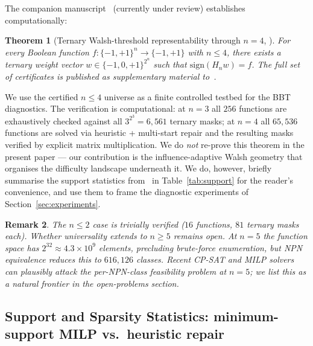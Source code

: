 \documentclass[11pt]{article}
\newtheorem{theorem}{Theorem}[section]
\newtheorem{remark}[theorem]{Remark}
\newcommand{\sign}{\mathrm{sign}}
\begin{document}
The companion manuscript~\cite{spectralSynthesisCompanion} (currently under review) establishes computationally:

\begin{theorem}[Ternary Walsh-threshold representability through $n=4$, \cite{spectralSynthesisCompanion}]
\label{thm:universality}
For every Boolean function $f:\{-1,+1\}^n \to \{-1,+1\}$ with $n \le 4$, there exists a ternary weight vector $w \in \{-1,0,+1\}^{2^n}$ such that $\sign(H_n w) = f$. The full set of certificates is published as supplementary material to~\cite{spectralSynthesisCompanion}.
\end{theorem}

We use the certified $n \le 4$ universe as a finite controlled testbed for the BBT diagnostics. The verification is computational: at $n=3$ all $256$ functions are exhaustively checked against all $3^{2^3}=6{,}561$ ternary masks; at $n=4$ all $65{,}536$ functions are solved via heuristic + multi-start repair and the resulting masks verified by explicit matrix multiplication. We do \emph{not} re-prove this theorem in the present paper --- our contribution is the influence-adaptive Walsh geometry that organises the difficulty landscape underneath it. We do, however, briefly summarise the support statistics from~\cite{spectralSynthesisCompanion} in Table~\ref{tab:support} for the reader's convenience, and use them to frame the diagnostic experiments of Section~\ref{sec:experiments}.

\begin{remark}
The $n \le 2$ case is trivially verified ($16$ functions, $81$ ternary masks each). Whether universality extends to $n \ge 5$ remains open. At $n=5$ the function space has $2^{32} \approx 4.3 \times 10^9$ elements, precluding brute-force enumeration, but NPN equivalence reduces this to $616{,}126$ classes. Recent CP-SAT and MILP solvers can plausibly attack the per-NPN-class feasibility problem at $n=5$; we list this as a natural frontier in the open-problems section.
\end{remark}

\subsection{Support and Sparsity Statistics: minimum-support MILP vs.\ heuristic repair}
\label{sec:support_stats}
\end{document}
